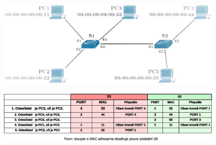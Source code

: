 \documentclass[10pt, a4paper]{article}%
\begin{document}
\begin{figure}[ht!]
	\centering
	\includegraphics[width = 1\textwidth]{zadani_sit.eps}
	
\end{figure}

\begin{figure}[ht!]
	\centering
	\includegraphics[width = 1\textwidth]{MAC_tables.eps}
	
\end{figure}
	
\end{document}
